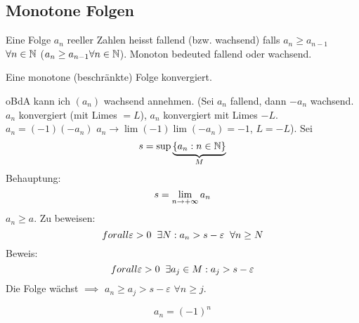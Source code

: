 \subsection{Monotone Folgen}
\begin{Def}
  Eine Folge $a_n$ reeller Zahlen heisst fallend (bzw. wachsend) falls $a_n\geq a_{n-1}$ $\forall n\in\mathbb{N}$ ($a_n\geq a_{n-1}\forall n\in\mathbb{N}$). Monoton bedeuted fallend oder wachsend.
\end{Def}
\begin{Sat}
  Eine monotone (beschränkte) Folge konvergiert.
\end{Sat}
\begin{Bew}
  oBdA kann ich $(a_n)$ wachsend annehmen. (Sei $a_n$ fallend, dann $-a_n$ wachsend. $a_n$ konvergiert (mit Limes $=L$), $a_n$ konvergiert mit Limes $-L$. $a_n=(-1)(-a_n)$ $a_n\to \lim(-1)\lim(-a_n)=-1$, $L=-L$). Sei 
  \[s=\sup \underbrace{\left\{ a_n:n\in\mathbb{N} \right\}}_M\]
  Behauptung:
  \[s=\displaystyle\lim_{n\to+\infty} a_n\]
  $a_n\geq a$. Zu beweisen:
  \[forall \varepsilon>0\hspace{2mm}\exists N: a_n> s-\varepsilon\hspace{2mm}\forall n\geq N\]
  Beweis:
  \[forall \varepsilon>0\hspace{2mm}\exists a_j\in M:a_j>s-\varepsilon\]
  Die Folge wächst $\implies$ $a_n\geq a_j>s-\varepsilon$ $\forall n\geq j$.
\end{Bew}
\begin{Bsp}
  \[a_n=(-1)^n\]
\end{Bsp}
